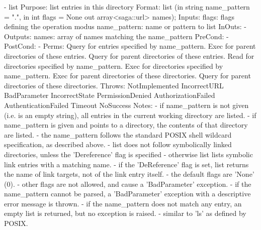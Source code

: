 \begin{myspec}
 
    - list
      Purpose:  list entries in this directory
      Format:   list               (in  string name_pattern = ".",
                                    in  int    flags        = None
                                    out array<saga::url> names);
      Inputs:   flags:              flags defining the operation
                                    modus
                name_pattern:       name or pattern to list
      InOuts:   -
      Outputs:  names:              array of names matching the
                                    name_pattern
      PreCond:  -
      PostCond: -
      Perms:    Query for entries specified by name_pattern.
                Exec  for parent directories of these entries.
                Query for parent directories of these entries.
                Read  for directories specified by name_pattern.
                Exec  for directories specified by name_pattern.
                Exec  for parent directories of these directories.
                Query for parent directories of these directories.
      Throws:   NotImplemented
                IncorrectURL
                BadParameter
                IncorrectState
                PermissionDenied
                AuthorizationFailed
                AuthenticationFailed
                Timeout
                NoSuccess
      Notes:    - if name_pattern is not given (i.e. is an empty 
                  string), all entries in the current working 
                  directory are listed.
                - if name_pattern is given and points to a 
                  directory, the contents of that directory 
                  are listed.
                - the name_pattern follows the standard POSIX 
                  shell wildcard specification, as described 
                  above.
                - list does not follow symbolically linked
                  directories, unless the 'Dereference' flag
                  is specified - otherwise list lists symbolic 
                  link entries with a matching name.
                - if the 'DeReference' flag is set, list 
                  returns the name of link targets, not of the
                  link entry itself.
                - the default flags are 'None' (0).
                - other flags are not allowed, and cause a
                  'BadParameter' exception.
                - if the name_pattern cannot be parsed, a
                  'BadParameter' exception with a descriptive
                  error message is thrown.
                - if the name_pattern does not match any entry,
                  an empty list is returned, but no exception is
                  raised.
                - similar to 'ls' as defined by POSIX.
 

\end{myspec}

